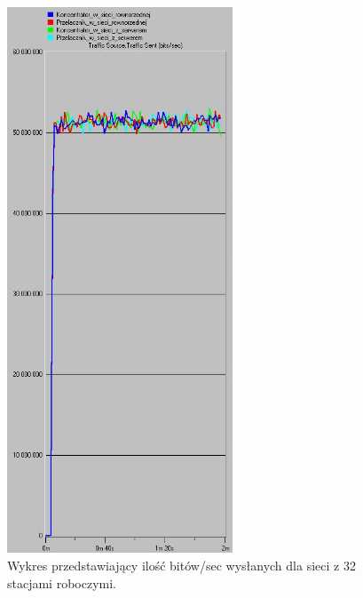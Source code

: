 \documentclass{article}
\begin{document}
\begin{figure}[H]
  \centering
  \includegraphics[width=0.60\textwidth]{screens/32_sent.png}
 \caption{Wykres przedstawiający ilość bitów/sec wysłanych dla sieci z 32 stacjami roboczymi.}
 \label{fig:2stacjes}
\end{figure}
\end{document}
